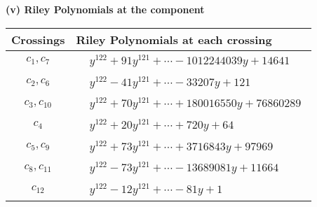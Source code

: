\documentclass[1p]{elsarticle_modified}
\theoremstyle{definition}
\begin{document}
\flushleft \textbf{(v) Riley Polynomials at the component}\newline \\
\begin{tabular}{m{50pt}|m{274pt}}
Crossings & \hspace{64pt}Riley Polynomials at each crossing \\
\hline $$\begin{aligned}c_{1},c_{7}\end{aligned}$$&$\begin{aligned}
&y^{122}+91 y^{121}+\cdots-1012244039 y+14641
\end{aligned}$\\
\hline $$\begin{aligned}c_{2},c_{6}\end{aligned}$$&$\begin{aligned}
&y^{122}-41 y^{121}+\cdots-33207 y+121
\end{aligned}$\\
\hline $$\begin{aligned}c_{3},c_{10}\end{aligned}$$&$\begin{aligned}
&y^{122}+70 y^{121}+\cdots+180016550 y+76860289
\end{aligned}$\\
\hline $$\begin{aligned}c_{4}\end{aligned}$$&$\begin{aligned}
&y^{122}+20 y^{121}+\cdots+720 y+64
\end{aligned}$\\
\hline $$\begin{aligned}c_{5},c_{9}\end{aligned}$$&$\begin{aligned}
&y^{122}+73 y^{121}+\cdots+3716843 y+97969
\end{aligned}$\\
\hline $$\begin{aligned}c_{8},c_{11}\end{aligned}$$&$\begin{aligned}
&y^{122}-73 y^{121}+\cdots-13689081 y+11664
\end{aligned}$\\
\hline $$\begin{aligned}c_{12}\end{aligned}$$&$\begin{aligned}
&y^{122}-12 y^{121}+\cdots-81 y+1
\end{aligned}$\\
\hline
\end{tabular}\\~\\
\end{document}
